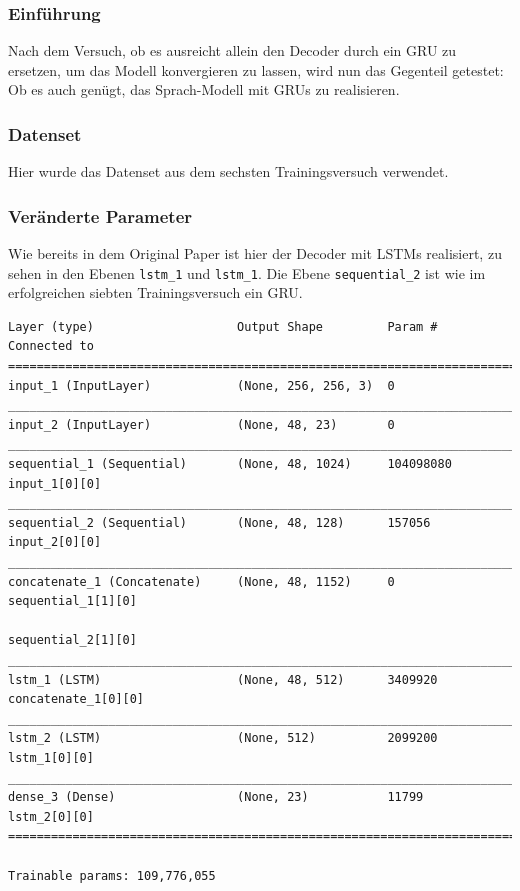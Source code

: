 \documentclass[pdftex,a4paper,halfparskip, article]{scrartcl}
\begin{document}
\subsubsection*{Einführung}

Nach dem Versuch, ob es ausreicht allein den Decoder durch ein GRU zu ersetzen, um das Modell konvergieren zu lassen, wird nun das Gegenteil getestet: Ob es auch genügt, das Sprach-Modell mit GRUs zu realisieren.

\subsubsection*{Datenset}

Hier wurde das Datenset aus dem sechsten Trainingsversuch verwendet.

\subsubsection*{Veränderte Parameter}

Wie bereits in dem Original Paper ist hier der Decoder mit LSTMs realisiert, zu sehen in den Ebenen \texttt{lstm\_1} und \texttt{lstm\_1}. Die Ebene \texttt{sequential\_2} ist wie im erfolgreichen siebten Trainingsversuch ein GRU.

\begin{verbatim}
Layer (type)                    Output Shape         Param #     Connected to
=============================================================================
input_1 (InputLayer)            (None, 256, 256, 3)  0
_____________________________________________________________________________
input_2 (InputLayer)            (None, 48, 23)       0
_____________________________________________________________________________
sequential_1 (Sequential)       (None, 48, 1024)     104098080   input_1[0][0]
_____________________________________________________________________________
sequential_2 (Sequential)       (None, 48, 128)      157056      input_2[0][0]
_____________________________________________________________________________
concatenate_1 (Concatenate)     (None, 48, 1152)     0           sequential_1[1][0]
                                                                 sequential_2[1][0]
_____________________________________________________________________________
lstm_1 (LSTM)                   (None, 48, 512)      3409920     concatenate_1[0][0]
_____________________________________________________________________________
lstm_2 (LSTM)                   (None, 512)          2099200     lstm_1[0][0]
_____________________________________________________________________________
dense_3 (Dense)                 (None, 23)           11799       lstm_2[0][0]
=============================================================================

Trainable params: 109,776,055

\end{verbatim}
\end{document}
